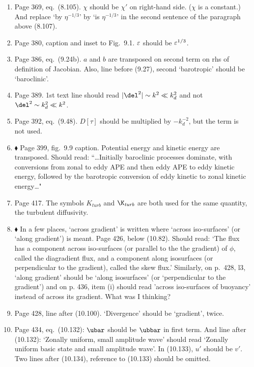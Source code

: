 \documentclass[10pt]{article}
\newcommand{\eq}{eq.\ } \newcommand{\Eq}{Eq.\ }
\renewcommand{\star}{\ensuremath{\blacklozenge} }
\begin{document}
\begin{enumerate}
\item Page 369, \eq (8.105). $\chi$ should be $\chi'$ on right-hand side. ($\chi$ is a constant.) And replace `by $\eta^{-1/3}$' by `is $\eta^{-1/3}$' in
the second sentence of the paragraph above (8.107). 

\item Page 380, caption and inset to Fig.\ 9.1. $\varepsilon$ should be $\varepsilon^{1/3}$. 

\item Page 386, \eq (9.24b). $a$ and $b$ are transposed on second term on rhs of definition of Jacobian. Also, line before (9.27), second `barotropic' should be `baroclinic'.

\item Page 389. 1st text line should read $|\del^2| \sim
k^2 \ll \kd^2$ and not $\del^2 \sim
\kd^2 \ll k^2$.

\item Page 392, \eq (9.48). $D[\tau]$ should be multiplied by $-k_d^{-2}$, but the term is not used.

\item \star \label{simmhosk} Page 399, fig.\ 9.9 caption.  Potential energy and kinetic energy are transposed. Should read: ``\ldots Initially baroclinic processes dominate, with conversions from zonal to eddy APE and then eddy APE to eddy kinetic energy, followed by the barotropic conversion of eddy kinetic to zonal kinetic energy\ldots"

\item Page 417. The symbols $K_\textit{turb}$ and $\K_\textit{turb}$ are both used for the same quantity, the turbulent diffusivity.

\item \star In a few places, `across gradient' is written where `across iso-surfaces' (or `along gradient') is meant. Page 426, below (10.82). Should read: `The flux has a component across iso-surfaces (or parallel to the the gradient) of $\phi$, called the diagradient flux, and a component along isosurfaces (or perpendicular to the gradient), called the skew flux.' Similarly, on p.\ 428, l3, `along gradient' should be `along isosurfaces' (or `perpendicular to the gradient') and on p. 436, item (i) should read 'across iso-surfaces of buoyancy' instead of across its gradient. What was I thinking?

\item Page 428, line after (10.100). `Divergence' should be `gradient', twice.

\item Page 434, \eq (10.132): $\ubar$ should be $\ubbar$ in first term. And line after (10.132): `Zonally uniform, small amplitude wave' should read `Zonally uniform basic state and small amplitude wave'. In (10.133), $u'$ should be $v'$. Two lines after (10.134), reference to (10.133) should be omitted.


\end{enumerate}
\end{document}
